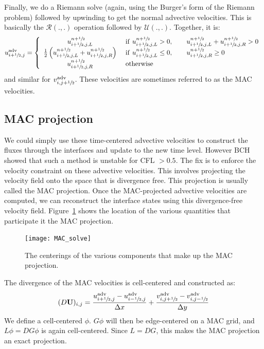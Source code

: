 Finally, we do a Riemann solve (again, using the Burger's form of the
Riemann problem) followed by upwinding to get the normal advective
velocities.  This is basically the $\mathcal{R}(.,.)$ operation followed 
by $\mathcal{U}(.,.)$.  Together, it is:
\begin{equation}
u^\mathrm{adv}_{i+{\sfrac{1}{2}},j} = \left \{ \begin{array}{cl}
   u_{i+{\sfrac{1}{2}},j,L}^{n+{\sfrac{1}{2}}}  & 
         \mathrm{~if~} u_{i+{\sfrac{1}{2}},j,L}^{n+{\sfrac{1}{2}}} > 0, \qquad 
                       u_{i+{\sfrac{1}{2}},j,L}^{n+{\sfrac{1}{2}}} + u_{i+{\sfrac{1}{2}},j,R}^{n+{\sfrac{1}{2}}} > 0 \\
   \frac{1}{2} \left ( u_{i+{\sfrac{1}{2}},j,L}^{n+{\sfrac{1}{2}}} +
                       u_{i+{\sfrac{1}{2}},j,R}^{n+{\sfrac{1}{2}}} \right )  &
          \mathrm{~if~} u_{i+{\sfrac{1}{2}},j,L}^{n+{\sfrac{1}{2}}} \le 0, \qquad 
                        u_{i+{\sfrac{1}{2}},j,R}^{n+{\sfrac{1}{2}}} \ge 0 \\
   u_{i+{\sfrac{1}{2}},j,R}^{n+{\sfrac{1}{2}}}  & \mathrm{~otherwise}
  \end{array}
  \right .
\end{equation}
and similar for $v^\mathrm{adv}_{i,j+{\sfrac{1}{2}}}$.  
These velocities are sometimes referred to as the MAC velocities.


\subsection{MAC projection}

We could simply use these time-centered advective velocities to
construct the fluxes through the interfaces and update to the new time
level.  However BCH showed that such a method is unstable for CFL $>
0.5$.  The fix is to enforce the velocity constraint on these advective
velocities.  This involves projecting the velocity field onto the
space that is divergence free.  This projection is usually called the
MAC projection.  Once the MAC-projected advective velocities are
computed, we can reconstruct the interface states using this
divergence-free velocity field.  Figure~\ref{fig:incomp:MACsolve}
shows the location of the various quantities that participate
it the MAC projection.

\begin{figure}[t]
\centering
\texttt{[image: MAC\_solve]}
\caption[MAC grid data centerings] {\label{fig:incomp:MACsolve} The
  centerings of the various components that make up the MAC
  projection.}
\end{figure}

The divergence of the MAC velocities is cell-centered and constructed as:
\begin{equation}
(D {\bf U})_{i,j} = \frac{u^\mathrm{adv}_{i+{\sfrac{1}{2}},j} - u^\mathrm{adv}_{i-{\sfrac{1}{2}},j}}
                   {\Delta x} +
              \frac{v^\mathrm{adv}_{i,j+{\sfrac{1}{2}}} - v^\mathrm{adv}_{i,j-{\sfrac{1}{2}}}}
                   {\Delta y}
\end{equation}
We define a cell-centered $\phi$.  $G\phi$ will then be edge-centered
on a MAC grid, and $L\phi = DG\phi$ is again cell-centered.  Since $L =
DG$, this makes the MAC projection an exact projection.

